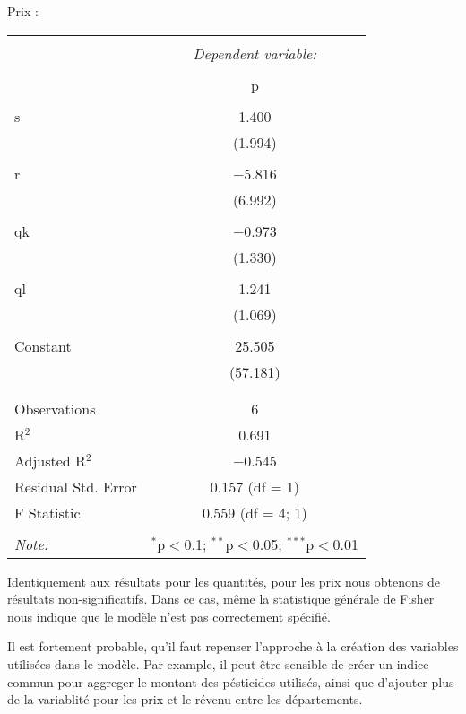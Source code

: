 \documentclass[11pt, a4paper]{article}
\begin{document}
\newpage
Prix :
\FloatBarrier
\begin{center}
\begin{tabular}{@{\extracolsep{5pt}}lc} 
\\[-1.8ex]\hline 
\hline \\[-1.8ex] 
 & \multicolumn{1}{c}{\textit{Dependent variable:}} \\ 
\cline{2-2}
\\[-1.8ex] & p \\ 
\hline \\[-1.8ex] 
 s & 1.400 \\ 
  & (1.994) \\ 
  & \\ 
 r & $-$5.816 \\ 
  & (6.992) \\ 
  & \\
 qk & $-$0.973 \\ 
  & (1.330) \\ 
  & \\
 ql & 1.241 \\ 
  & (1.069) \\ 
  & \\ 
 Constant & 25.505 \\ 
  & (57.181) \\ 
  & \\ 
\hline \\[-1.8ex] 
Observations & 6 \\ 
R$^{2}$ & 0.691 \\ 
Adjusted R$^{2}$ & $-$0.545 \\ 
Residual Std. Error & 0.157 (df = 1) \\ 
F Statistic & 0.559 (df = 4; 1) \\ 
\hline 
\hline \\[-1.8ex] 
\textit{Note:}  & \multicolumn{1}{r}{$^{*}$p$<$0.1; $^{**}$p$<$0.05; $^{***}$p$<$0.01} 
\\ 
\end{tabular}
\end{center}
\FloatBarrier
Identiquement aux résultats pour les quantités, pour les prix nous obtenons de résultats non-significatifs. 
Dans ce cas, même la statistique générale de Fisher nous indique que le modèle n'est pas correctement spécifié. 
\par
Il est fortement probable, qu'il faut repenser l'approche à la création des variables utilisées dans le modèle.
Par example, il peut être sensible de créer un indice commun pour aggreger le montant des pésticides utilisés, ainsi que d'ajouter plus de la variablité pour les prix et le révenu entre les départements. 
\end{document}
